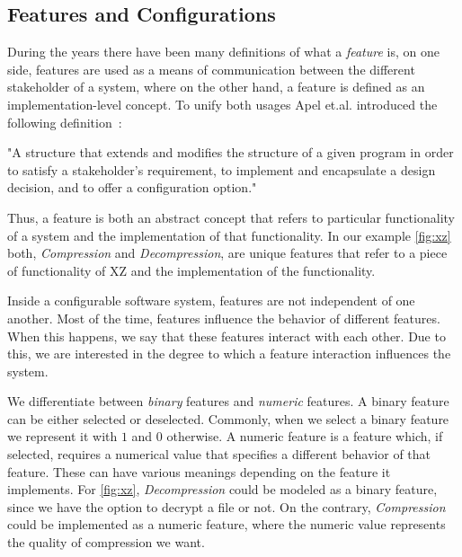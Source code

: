 \subsection{Features and Configurations}\label{feature-config}

During the years there have been many definitions of what a \emph{feature} is, on one side, features are used as a means of communication between
the different stakeholder of a system, where on the other hand, a feature is defined as an implementation-level concept. 
To unify both usages Apel et.al. introduced the following definition~\cite{Feature-Oriented-Software-Product-Lines}:

\begin{definition}
    "A structure that extends and modifies the structure of a
    given program in order to satisfy a stakeholder's requirement, to implement and
    encapsulate a design decision, and to offer a configuration option."     
\end{definition}

Thus, a feature is both an abstract concept that refers to particular functionality of a system and the implementation of that functionality.
In our example \autoref{fig:xz} both, \textit{Compression} and \textit{Decompression}, are unique features 
that refer to a piece of functionality of \textsc{XZ} and the implementation of the functionality. 

Inside a configurable software system, features are not independent of one another. 
Most of the time, features influence the behavior of different features. 
When this happens, we say that these features interact with each other. 
Due to this, we are interested in the degree to which a feature interaction influences the system.

We differentiate between \emph{binary} features and \emph{numeric} features. A binary feature can be either selected or deselected.
Commonly, when we select a binary feature we represent it with $1$ and $0$ otherwise. 
A numeric feature is a feature which, if selected, requires a numerical value that specifies a different behavior of that feature.
These can have various meanings depending on the feature it implements. 
For \autoref{fig:xz}, \textit{Decompression} could be modeled as a binary feature, since we have the option to decrypt a file or not. On the contrary, 
\textit{Compression} could be implemented as a numeric feature, where the numeric value represents the quality of compression we want. 

